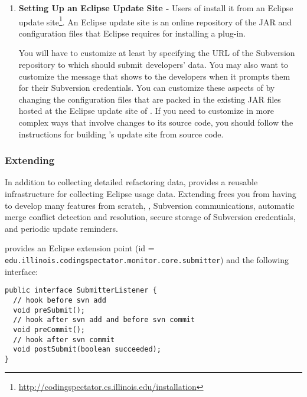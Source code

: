 \begin{enumerate}
\item
\textbf{Setting Up an Eclipse Update Site -}
Users of \CodingSpectator{} install it from an Eclipse update
site\footnote{\url{http://codingspectator.cs.illinois.edu/installation}}. An
Eclipse update site is an online repository of the JAR and configuration files
that Eclipse requires for installing a plug-in.

You will have to customize \CodingSpectator{} at least by specifying the URL of
the Subversion repository to which \CodingSpectator{} should submit developers' data.
You may also want to customize the message that \CodingSpectator{} shows to the
developers when it prompts them for their Subversion credentials. You can customize
these aspects of \CodingSpectator{} by changing the configuration files that are
packed in the existing JAR files hosted at the Eclipse update site of
\CodingSpectator. If you need to customize \CodingSpectator{} in more complex
ways that involve changes to its source code, you should follow the instructions
for building \CodingSpectator's update site from source code.
\end{enumerate}

\subsubsection{Extending \CodingSpectator}

In addition to collecting detailed refactoring data, \CodingSpectator{} provides
a reusable infrastructure for collecting Eclipse usage data. Extending
\CodingSpectator{} frees you from having to develop many features from
scratch, \eg, Subversion communications, automatic merge conflict detection and
resolution, secure storage of Subversion credentials, and periodic update
reminders.

\CodingSpectator{} provides an Eclipse extension point (id =
\texttt{edu.\-illinois.\-codingspectator.\-monitor.\-core.\-submitter}) and the
following interface:

\begin{lstlisting}
public interface SubmitterListener {
  // hook before svn add
  void preSubmit();
  // hook after svn add and before svn commit
  void preCommit();
  // hook after svn commit
  void postSubmit(boolean succeeded);
}
\end{lstlisting}


